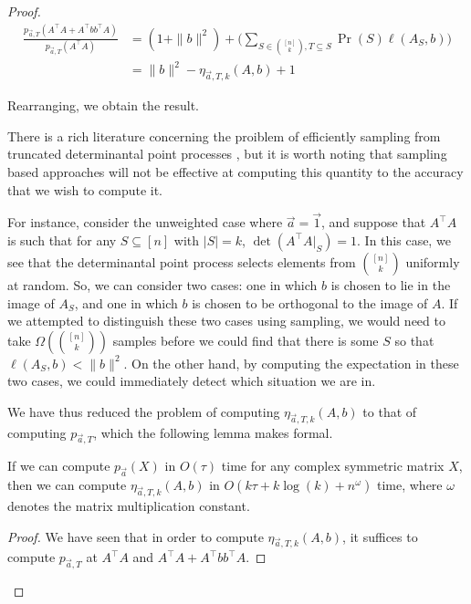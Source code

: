 \begin{proof}
    \begin{align*}
        \frac{p_{\vec{a}, T}(A^{\intercal}A + A^{\intercal}bb^{\intercal}A)}{p_{\vec{a}, T}(A^{\intercal}A)} &= (1+\|b\|^2) + \big(\sum_{S \in \binom{[n]}{k}, T \subseteq S}\Pr(S)\ell(A_S,b)\big)\\
                                                                                                      &= \|b\|^2 - 
                                                                                                      \eta_{\vec{a}, T, k}(A, b) + 1
    \end{align*}

    Rearranging, we obtain the result.
    
\begin{remark}
    There is a rich literature concerning the proiblem of efficiently sampling from truncated determinantal point processes \cite{TODO}, but it is worth noting that sampling based approaches will not be effective at computing this quantity to the accuracy that we wish to compute it.

   For instance, consider the unweighted case where $\vec{a} = \vec{1}$, and suppose that $A^{\intercal}A$ is such that for any $S \subseteq [n]$ with $|S| = k$, $\det(A^{\intercal}A|_S) = 1$.
   In this case, we see that the determinantal point process selects elements from $\binom{[n]}{k}$ uniformly at random.
   So, we can consider two cases: one in which $b$ is chosen to lie in the image of $A_S$, and one in which $b$ is chosen to be orthogonal to the image of $A$.
   If we attempted to distinguish these two cases using sampling, we would need to take $\Omega(\binom{[n]}{k})$ samples before we could find that there is some $S$ so that $\ell(A_S, b) < \|b\|^2$.
   On the other hand, by computing the expectation in these two cases, we could immediately detect which situation we are in.
\end{remark}

We have thus reduced the problem of computing $\eta_{\vec{a}, T, k}(A, b)$ to that of computing $p_{\vec{a}, T}$, which the following lemma makes formal.

\begin{lemma}
    If we can compute $p_{\vec{a}}(X)$ in $O(\tau)$ time for any complex symmetric matrix $X$, then we can compute  $\eta_{\vec{a}, T, k}(A, b)$ in $O(k\tau + k\log(k) + n^\omega)$ time, where $\omega$ denotes the matrix multiplication constant.
\end{lemma}
\begin{proof}
    We have seen that in order to compute $\eta_{\vec{a}, T, k}(A, b)$, it suffices to compute $p_{\vec{a}, T}$ at $A^{\intercal}A$ and $A^{\intercal}A+A^{\intercal}bb^{\intercal}A$.


\end{proof}
\end{proof}

